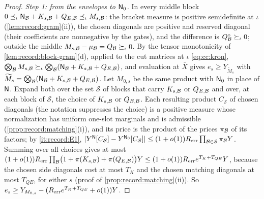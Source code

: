 \begin{proof}
\emph{Step 1: from the envelopes to $\mathsf N_0$.} In every middle block
$0\preceq_\iota\mathsf N_\mathcal B+K_{s,\mathcal B}+Q_{E,\mathcal B}\preceq_\iota M_{s,\mathcal B}$: the bracket
measure is positive semidefinite at $\iota$ (\cref{lem:record:gram}(ii)), the
chosen diagonals are positive and reserved diagonal (their coefficients are
nonnegative by the gates), and the difference is $Q^\circ_\mathcal B\succeq_\iota0$;
outside the middle $M_{s,\mathcal B}-\mu_\mathcal B=Q_\mathcal B\succeq_\iota0$. By the tensor
monotonicity of \cref{lem:record:block-gram}(d), applied to the cut matrices at
$\iota$ \eqref{eq:cc:kron}, $\bigotimes_\mathcal B M_{s,\mathcal B}\succeq_\iota
\bigotimes_\mathcal B(\mathsf N_\mathcal B+K_{s,\mathcal B}+Q_{E,\mathcal B})$, and evaluation at $\bar X$ gives
$e_s\ge Y_{\widetilde M_s}$ with $\widetilde M_s=\bigotimes_\mathcal B(\mathsf N_\mathcal B+K_{s,\mathcal B}+Q_{E,\mathcal B})$.
Let $M_{0,s}$ be the same product with $\mathsf N_0$ in place of $\mathsf N$. Expand both
over the set $\mathcal S$ of blocks that carry $K_{s,\mathcal B}$ or $Q_{E,\mathcal B}$ and
over, at each block of $\mathcal S$, the choice of $K_{s,\mathcal B}$ or $Q_{E,\mathcal B}$. Each resulting product $C_{\mathcal S}$ of chosen diagonals (the notation suppresses the choice) is a positive measure whose normalization
has uniform one-slot marginals and is admissible (\cref{prop:record:matching}(i)),
and its price is the product of the prices $\pi_\mathcal B$ of its factors; by
\ref{it:record:E1},
$|Y^{\mathsf N}[C_{\mathcal S}]-Y^{\mathsf N_0}[C_{\mathcal S}]|\le(1+o(1))R_{\rm err}
\prod_{\mathcal B\in\mathcal S}\pi_\mathcal B Y$. Summing over all choices gives at most
$(1+o(1))R_{\rm err}\prod_\mathcal B\bigl(1+\pi(K_{s,\mathcal B})+\pi(Q_{E,\mathcal B})\bigr)Y\le
(1+o(1))R_{\rm err}e^{T_K+T_{QE}}Y$, because the chosen side diagonals cost at most
$T_K$ and the chosen matching diagonals at most $T_{QE}$, for either $s$ (proof of
\cref{prop:record:matching}(ii)). So
$e_s\ge Y_{M_{0,s}}-(R_{\rm err}e^{T_K+T_{QE}}+o(1))Y$.


\end{proof}
